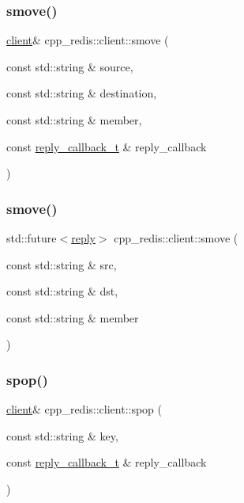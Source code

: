 \subsubsection{\texorpdfstring{smove()}{smove()}\hspace{0.1cm}{\footnotesize\ttfamily [1/2]}}
{\footnotesize\ttfamily \hyperlink{classcpp__redis_1_1client}{client}\& cpp\+\_\+redis\+::client\+::smove (\begin{DoxyParamCaption}\item[{const std\+::string \&}]{source,  }\item[{const std\+::string \&}]{destination,  }\item[{const std\+::string \&}]{member,  }\item[{const \hyperlink{classcpp__redis_1_1client_a061a1140d36d2eaeda82b09a0bb3f9f2}{reply\+\_\+callback\+\_\+t} \&}]{reply\+\_\+callback }\end{DoxyParamCaption})}

\mbox{\label{classcpp__redis_1_1client_a4524b915c1180a4c57ffb16f660108ba}} 
\subsubsection{\texorpdfstring{smove()}{smove()}\hspace{0.1cm}{\footnotesize\ttfamily [2/2]}}
{\footnotesize\ttfamily std\+::future$<$\hyperlink{classcpp__redis_1_1reply}{reply}$>$ cpp\+\_\+redis\+::client\+::smove (\begin{DoxyParamCaption}\item[{const std\+::string \&}]{src,  }\item[{const std\+::string \&}]{dst,  }\item[{const std\+::string \&}]{member }\end{DoxyParamCaption})}

\mbox{\label{classcpp__redis_1_1client_a9a59ca9396d1447ae3a8bb584449e174}} 
\subsubsection{\texorpdfstring{spop()}{spop()}\hspace{0.1cm}{\footnotesize\ttfamily [1/4]}}
{\footnotesize\ttfamily \hyperlink{classcpp__redis_1_1client}{client}\& cpp\+\_\+redis\+::client\+::spop (\begin{DoxyParamCaption}\item[{const std\+::string \&}]{key,  }\item[{const \hyperlink{classcpp__redis_1_1client_a061a1140d36d2eaeda82b09a0bb3f9f2}{reply\+\_\+callback\+\_\+t} \&}]{reply\+\_\+callback }\end{DoxyParamCaption})}

